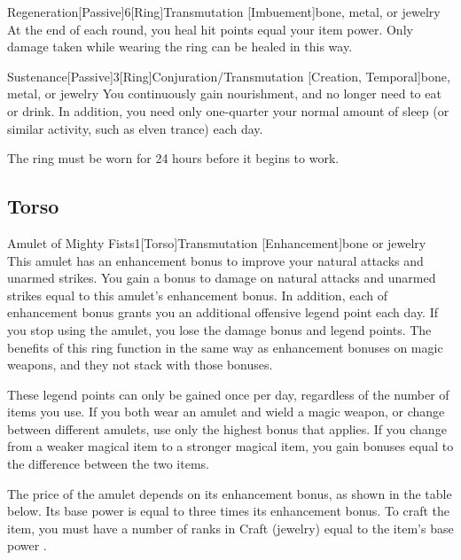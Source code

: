         \begin{magicitemdef}{Regeneration}[Passive]{6}[Ring]{Transmutation [Imbuement]}{bone, metal, or jewelry}
             At the end of each round, you heal hit points equal your item power.
            Only damage taken while wearing the ring can be healed in this way.
        \end{magicitemdef}

        \begin{magicitemdef}{Sustenance}[Passive]{3}[Ring]{Conjuration/Transmutation [Creation, Temporal]}{bone, metal, or jewelry}
             You continuously gain nourishment, and no longer need to eat or drink.
            In addition, you need only one-quarter your normal amount of sleep (or similar activity, such as elven trance) each day.

            The ring must be worn for 24 hours before it begins to work.
        \end{magicitemdef}

    \subsection{Torso}

        \begin{magicitemdef}{Amulet of Mighty Fists}{1}[Torso]{Transmutation [Enhancement]}{bone or jewelry}
             This amulet has an enhancement bonus to improve your natural attacks and unarmed strikes.
            You gain a bonus to damage on natural attacks and unarmed strikes equal to this amulet's enhancement bonus.
            In addition, each  of enhancement bonus grants you an additional offensive legend point each day.
            If you stop using the amulet, you lose the damage bonus and legend points.
            The benefits of this ring function in the same way as enhancement bonuses on magic weapons, and they not stack with those bonuses.

            These legend points can only be gained once per day, regardless of the number of items you use.
            If you both wear an amulet and wield a magic weapon, or change between different amulets, use only the highest bonus that applies.
            If you change from a weaker magical item to a stronger magical item, you gain bonuses equal to the difference between the two items.

            \spellspecial The price of the amulet depends on its enhancement bonus, as shown in the table below.
            Its base power is equal to three times its enhancement bonus.
            To craft the item, you must have a number of ranks in Craft (jewelry) equal to the item's base power .
        \end{magicitemdef}

